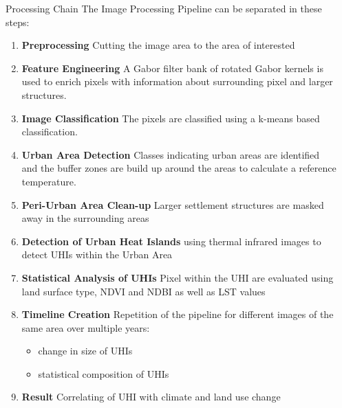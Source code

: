 \documentclass[final,20pt]{beamer}
\newlength{\sepwidth}
\newlength{\colwidth}
\newcommand{\separatorcolumn}{\begin{column}{\sepwidth}\end{column}}
\begin{document}
\begin{frame}[t]
\begin{columns}[t]
\begin{column}{\colwidth}
  \begin{block}{Processing Chain}
   The Image Processing Pipeline can be separated in these steps:
    \begin{enumerate}
      \setlength\itemsep{0.5em}
      \item \textbf{Preprocessing} Cutting the image area to the area of interested
      \item \textbf{Feature Engineering} A Gabor filter bank of rotated Gabor kernels is used to enrich pixels with information about surrounding pixel and larger structures.
      \item \textbf{Image Classification}  The pixels are classified using a k-means based classification. 
      \item \textbf{Urban Area Detection} Classes indicating urban areas are identified and the buffer zones are build up around the areas to calculate a reference temperature.
      \item \textbf{Peri-Urban Area Clean-up} Larger settlement structures are masked away in the surrounding areas
      \item \textbf{Detection of Urban Heat Islands} using thermal infrared images to detect UHIs within the Urban Area
      \item \textbf{Statistical Analysis of UHIs} Pixel within the UHI are evaluated using land surface type, NDVI and NDBI as well as LST values 
      \item \textbf{Timeline Creation} Repetition of the pipeline for different images of the same area over multiple years:
        \begin{itemize}
          \setlength\itemsep{0.5em}
          \item change in size of UHIs 
          \item statistical composition of UHIs 
        \end{itemize}
      \setlength\itemsep{0.5em}
      \item \textbf{Result} Correlating of UHI with climate and land use change 
    \end{enumerate}
  \end{block}

\end{column}

\separatorcolumn%


\end{columns}
\end{frame}
\end{document}
